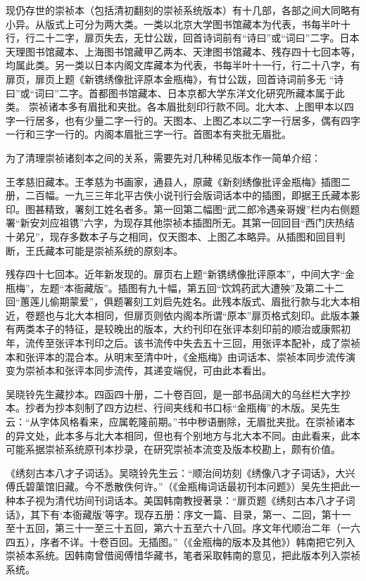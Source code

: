 \documentclass[a4paper,12pt,UTF8,twoside]{ctexbook}
\begin{document}
现仍存世的崇祯本（包括清初翻刻的崇祯系统版本）有十几部，各部之间大同略有小异。从版式上可分为两大类。一类以北京大学图书馆藏本为代表，书每半叶十行，行二十二字，扉页失去，无廿公跋，回首诗词前有“诗曰”或“词曰”二字。日本天理图书馆藏本、上海图书馆藏甲乙两本、天津图书馆藏本、残存四十七回本等，均属此类。另一类以日本内阁文库藏本为代表，书每半叶十一行，行二十八字，有扉页，扉页上题《新镌绣像批评原本金瓶梅》，有廿公跋，回首诗词前多无 “诗曰”或“词曰”二字。首都图书馆藏本、日本京都大学东洋文化研究所藏本属于此类。
崇祯诸本多有眉批和夹批。各本眉批刻印行款不同。北大本、上图甲本以四字一行居多，也有少量二字一行的。天图本、上图乙本以二字一行居多，偶有四字一行和三字一行的。内阁本眉批三字一行。首图本有夹批无眉批。

为了清理崇祯诸刻本之间的关系，需要先对几种稀见版本作一简单介绍：

王孝慈旧藏本。王孝慈为书画家，通县人，原藏《新刻绣像批评金瓶梅》插图二册，二百幅。一九三三年北平古佚小说刊行会版词话本中的插图，即据王氏藏本影印。图甚精致，署刻工姓名者多。第一回第二幅图“武二郎冷遇亲哥嫂”栏内右侧题署“新安刘应祖镌”六字，为现存其他崇祯本插图所无。其第一回回目“西门庆热结十弟兄”，现存多数本子与之相同，仅天图本、上图乙本略异。从插图和回目判断，王氏藏本可能是崇祯系统的原刻本。

残存四十七回本。近年新发现的。扉页右上题“新镌绣像批评原本”，中间大字“金瓶梅”，左题“本衙藏版”。插图有九十幅，第五回“饮鸩药武大遭殃”及第二十二回“蕙莲儿偷期蒙爱”，俱题署刻工刘启先姓名。此残本版式、眉批行款与北大本相近，卷题也与北大本相同，但扉页则依内阁本所谓“原本”扉页格式刻印。此版本兼有两类本子的特征，是较晚出的版本，大约刊印在张评本刻印前的顺治或康熙初年，流传至张评本刊印之后。该书流传中失去五十三回，用张评本配补，成了崇祯本和张评本的混合本。从明末至清中叶，《金瓶梅》由词话本、崇祯本同步流传演变为崇祯本和张评本同步流传，其递变端倪，可由此本看出。

吴晓铃先生藏抄本。四函四十册，二十卷百回，是一部书品阔大的乌丝栏大字抄本。抄者为抄本刻制了四方边栏、行间夹线和书口标“金瓶梅”的木版。吴先生云：“从字体风格看来，应属乾隆前期。”书中秽语删除，无眉批夹批。在崇祯诸本的异文处，此本多与北大本相同，但也有个别地方与北大本不同。由此看来，此本可能系据崇祯系统原刊本抄录，在研究崇祯本流变及版本校勘上，颇有价值。

《绣刻古本八才子词话》。吴晓铃先生云：“顺治间坊刻《绣像八才子词话》，大兴傅氏碧蕖馆旧藏。今不悉散佚何许。”（《金瓶梅词话最初刊本问题》）吴先生把此一种本子视为清代坊间刊词话本。美国韩南教授著录：“扉页题《绣刻古本八才子词话》，其下有‘本衙藏版’等字。现存五册：序文一篇、目录，第一、二回，第十一至十五回，第三十一至三十五回，第六十五至六十八回。序文年代顺治二年（一六四五），序者不详。十卷百回。无插图。”（《金瓶梅的版本及其他》）韩南把它列入崇祯本系统。因韩南曾借阅傅惜华藏书，笔者采取韩南的意见，把此版本列入崇祯系统。
\end{document}
